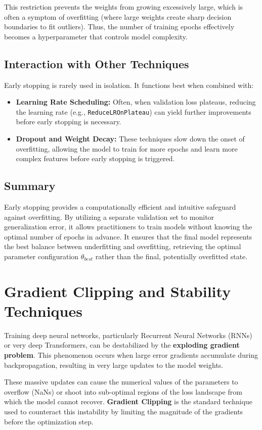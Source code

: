 \documentclass[12pt,a4paper]{report}
\begin{document}
This restriction prevents the weights from growing excessively large, which is often a symptom of overfitting (where large weights create sharp decision boundaries to fit outliers). Thus, the number of training epochs effectively becomes a hyperparameter that controls model complexity.

\subsection{Interaction with Other Techniques}
Early stopping is rarely used in isolation. It functions best when combined with:
\begin{itemize}
    \item \textbf{Learning Rate Scheduling:} Often, when validation loss plateaus, reducing the learning rate (e.g., \texttt{ReduceLROnPlateau}) can yield further improvements before early stopping is necessary.
    \item \textbf{Dropout and Weight Decay:} These techniques slow down the onset of overfitting, allowing the model to train for more epochs and learn more complex features before early stopping is triggered.
\end{itemize}

\subsection{Summary}
Early stopping provides a computationally efficient and intuitive safeguard against overfitting. By utilizing a separate validation set to monitor generalization error, it allows practitioners to train models without knowing the optimal number of epochs in advance. It ensures that the final model represents the best balance between underfitting and overfitting, retrieving the optimal parameter configuration $\theta_{best}$ rather than the final, potentially overfitted state.

\section{Gradient Clipping and Stability Techniques}

Training deep neural networks, particularly Recurrent Neural Networks (RNNs) or very deep Transformers, can be destabilized by the \textbf{exploding gradient problem}. This phenomenon occurs when large error gradients accumulate during backpropagation, resulting in very large updates to the model weights.

These massive updates can cause the numerical values of the parameters to overflow (NaNs) or shoot into sub-optimal regions of the loss landscape from which the model cannot recover. \textbf{Gradient Clipping} is the standard technique used to counteract this instability by limiting the magnitude of the gradients before the optimization step.
\end{document}
